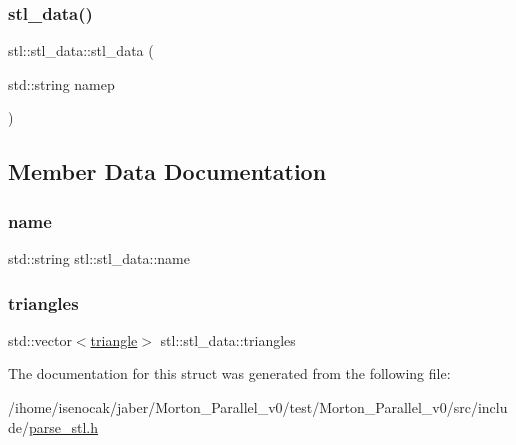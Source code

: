 \subsubsection{\texorpdfstring{stl\+\_\+data()}{stl\_data()}}
{\footnotesize\ttfamily stl\+::stl\+\_\+data\+::stl\+\_\+data (\begin{DoxyParamCaption}\item[{std\+::string}]{namep }\end{DoxyParamCaption})\hspace{0.3cm}{\ttfamily [inline]}}



\subsection{Member Data Documentation}
\mbox{\label{structstl_1_1stl__data_a567a8c7ba6526f8c70b52ef97e965cc4}} 
\subsubsection{\texorpdfstring{name}{name}}
{\footnotesize\ttfamily std\+::string stl\+::stl\+\_\+data\+::name}

\mbox{\label{structstl_1_1stl__data_a901ead3f2f8f2f3563a2e4bee87b825e}} 
\subsubsection{\texorpdfstring{triangles}{triangles}}
{\footnotesize\ttfamily std\+::vector$<$\mbox{\hyperlink{structstl_1_1triangle}{triangle}}$>$ stl\+::stl\+\_\+data\+::triangles}



The documentation for this struct was generated from the following file\+:\begin{DoxyCompactItemize}
\item 
/ihome/isenocak/jaber/\+Morton\+\_\+\+Parallel\+\_\+v0/test/\+Morton\+\_\+\+Parallel\+\_\+v0/src/include/\mbox{\hyperlink{parse__stl_8h}{parse\+\_\+stl.\+h}}\end{DoxyCompactItemize}
